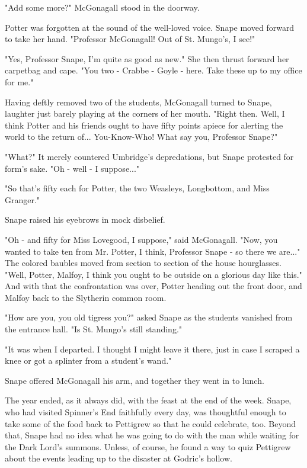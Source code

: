 "Add some more?" McGonagall stood in the doorway.

Potter was forgotten at the sound of the well-loved voice. Snape moved forward to take her hand. "Professor McGonagall! Out of St. Mungo's, I see!"

"Yes, Professor Snape, I'm quite as good as new." She then thrust forward her carpetbag and cape. "You two - Crabbe - Goyle - here. Take these up to my office for me."

Having deftly removed two of the students, McGonagall turned to Snape, laughter just barely playing at the corners of her mouth. "Right then. Well, I think Potter and his friends ought to have fifty points apiece for alerting the world to the return of... You-Know-Who! What say you, Professor Snape?"

"What?" It merely countered Umbridge's depredations, but Snape protested for form's sake. "Oh - well - I suppose..."

"So that's fifty each for Potter, the two Weasleys, Longbottom, and Miss Granger."

Snape raised his eyebrows in mock disbelief.

"Oh - and fifty for Miss Lovegood, I suppose," said McGonagall. "Now, you wanted to take ten from Mr. Potter, I think, Professor Snape - so there we are..." The colored baubles moved from section to section of the house hourglasses. "Well, Potter, Malfoy, I think you ought to be outside on a glorious day like this." And with that the confrontation was over, Potter heading out the front door, and Malfoy back to the Slytherin common room.

"How are you, you old tigress you?" asked Snape as the students vanished from the entrance hall. "Is St. Mungo's still standing."

"It was when I departed. I thought I might leave it there, just in case I scraped a knee or got a splinter from a student's wand."

Snape offered McGonagall his arm, and together they went in to lunch.

The year ended, as it always did, with the feast at the end of the week. Snape, who had visited Spinner's End faithfully every day, was thoughtful enough to take some of the food back to Pettigrew so that he could celebrate, too. Beyond that, Snape had no idea what he was going to do with the man while waiting for the Dark Lord's summons. Unless, of course, he found a way to quiz Pettigrew about the events leading up to the disaster at Godric's hollow.

